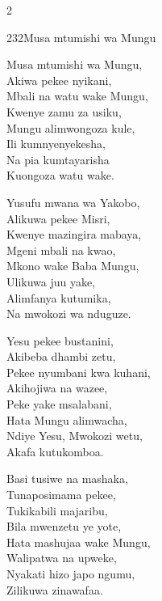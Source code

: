 \begin{multicols}{2}
\begin{hymn}{232}{Musa mtumishi wa Mungu}{}
\begin{stanza}
Musa mtumishi wa Mungu,\\
Akiwa pekee nyikani,\\
Mbali na watu wake Mungu,\\
Kwenye zamu za usiku,\\
Mungu alimwongoza kule,\\
Ili kumnyenyekesha,\\
Na pia kumtayarisha\\
Kuongoza watu wake.
\end{stanza}
\begin{stanza}
Yusufu mwana wa Yakobo,\\
Alikuwa pekee Misri,\\
Kwenye mazingira mabaya,\\
Mgeni mbali na kwao,\\
Mkono wake Baba Mungu,\\
Ulikuwa juu yake,\\
Alimfanya kutumika,\\
Na mwokozi wa nduguze.
\end{stanza}
\begin{stanza}
Yesu pekee bustanini,\\
Akibeba dhambi zetu,\\
Pekee nyumbani kwa kuhani,\\
Akihojiwa na wazee,\\
Peke yake msalabani,\\
Hata Mungu alimwacha,\\
Ndiye Yesu, Mwokozi wetu,\\
Akafa kutukomboa.
\end{stanza}
\begin{stanza}
Basi tusiwe na mashaka,\\
Tunaposimama pekee,\\
Tukikabili majaribu,\\
Bila mwenzetu ye yote,\\
Hata mashujaa wake Mungu,\\
Walipatwa na upweke,\\
Nyakati hizo japo ngumu,\\
Zilikuwa zinawafaa.
\end{stanza}
\end{hymn}


\end{multicols}
